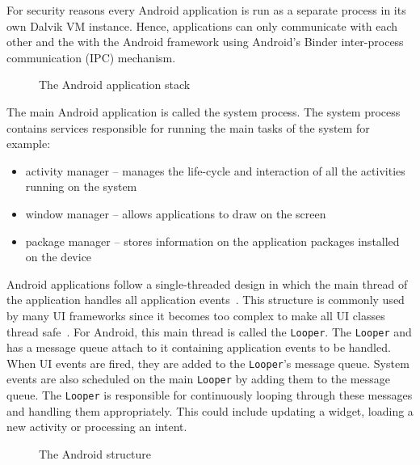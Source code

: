 \documentclass{acm_proc_article-sp}
\begin{document}
For security reasons every Android application is run as a separate process in its own Dalvik VM instance. Hence, applications can only
communicate with each other and the with the Android framework using Android's Binder inter-process communication (IPC) mechanism. 

\begin{figure}
\centering
{}
\caption{The Android application stack}
\end{figure}

The main Android application is called the system process. The system process contains services responsible for running the main tasks of the system for example:
\begin{itemize}
 \item activity manager -- manages the life-cycle and interaction of all the activities running on the system
 \item window manager -- allows applications to draw on the screen
 \item package manager -- stores information on the application packages installed on the device
\end{itemize}

Android applications follow a single-threaded design in which the main thread of the application handles all application events~\cite{AndroidDocs}. This structure is
commonly used by many UI frameworks since it becomes too complex to make all UI classes thread safe~\cite{SingleThread}. For Android, this main thread is called
the \texttt{Looper}. The \texttt{Looper} and has a message queue attach to it containing application events to be handled. When UI events are fired, they
are added to the \texttt{Looper}'s message queue. System events are also scheduled on the main \texttt{Looper} by adding them to the message
queue. The \texttt{Looper} is responsible for continuously looping through these messages and handling them appropriately. This could
include updating a widget, loading a new activity or processing an intent.

\begin{figure}
\centering
{}
\caption{The Android structure}
\end{figure}
\end{document}
